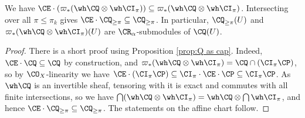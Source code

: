 \documentclass[11pt,reqno]{amsart}
\begin{document}
\begin{lemma}\label{lem:Qk is submod of Q}
    We have $\CE\cdot (\varpi_*(\wh\CQ\otimes \wh\CI_\pi))\subseteq \varpi_*(\wh\CQ\otimes \wh\CI_\pi)$. Intersecting over all $\pi\le \pi_k$ gives $\CE\cdot \CQ_{\ge\pi}\subseteq \CQ_{\ge\pi}$. In particular, $\CQ_{\ge\pi}(U)$ and $\varpi_*(\wh\CQ\otimes \wh\CI_\pi)(U)$ are $\CR_\alpha$-submodules of $\CQ(U)$. 

\end{lemma}
\begin{proof}
    There is a short proof using Proposition \ref{prop:Q as cap}. Indeed, $\CE\cdot \CQ\subseteq\CQ$ by construction, and $\varpi_*(\wh\CQ\otimes \wh\CI_\pi)=\CQ\cap (\CI_\pi \CP)$, so by $\CO_X$-linearity we have $\CE\cdot (\CI_\pi\CP)\subseteq \CI_\pi\cdot \CE\cdot \CP\subseteq\CI_\pi\CP$. As $\wh\CQ$ is an invertible sheaf, tensoring with it is exact and commutes with all finite intersections, so we have $\bigcap(\wh\CQ\otimes\wh\CI_\pi)=\wh\CQ\otimes\bigcap \wh\CI_\pi$, and hence $\CE\cdot\CQ_{\ge\pi}\subseteq\CQ_{\ge\pi}$. The statements on the affine chart follow. 

\end{proof}
\end{document}
